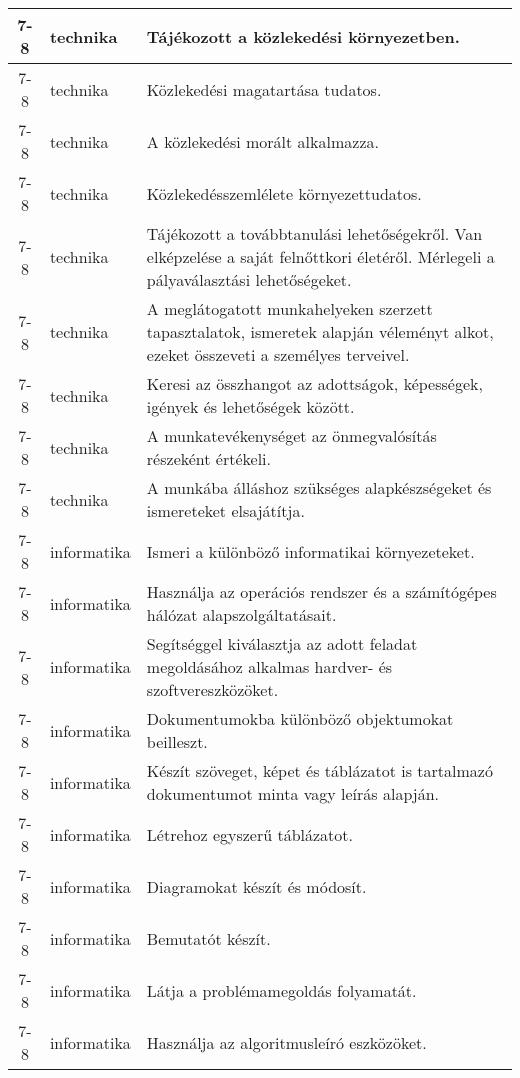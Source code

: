 \begin{small}
\begin{longtable}{c | p{2cm} |  p{11cm} }
              7-8 & technika & Tájékozott a közlekedési környezetben. \\ \hline
              7-8 & technika & Közlekedési magatartása tudatos. \\ \hline
              7-8 & technika & A közlekedési morált alkalmazza. \\ \hline
              7-8 & technika & Közlekedésszemlélete környezettudatos. \\ \hline
              7-8 & technika & Tájékozott a továbbtanulási lehetőségekről. Van elképzelése a saját felnőttkori életéről. Mérlegeli a pályaválasztási lehetőségeket. \\ \hline
              7-8 & technika & A meglátogatott munkahelyeken szerzett tapasztalatok, ismeretek alapján véleményt alkot, ezeket összeveti a személyes terveivel. \\ \hline
              7-8 & technika & Keresi az összhangot az adottságok, képességek, igények és lehetőségek között. \\ \hline
              7-8 & technika & A munkatevékenységet az önmegvalósítás részeként értékeli. \\ \hline
              7-8 & technika & A munkába álláshoz szükséges alapkészségeket és ismereteket elsajátítja. \\ \hline
              7-8 & informatika & Ismeri a különböző informatikai környezeteket. \\ \hline
              7-8 & informatika & Használja az operációs rendszer és a számítógépes hálózat alapszolgáltatásait. \\ \hline
              7-8 & informatika & Segítséggel kiválasztja az adott feladat megoldásához alkalmas hardver- és szoftvereszközöket. \\ \hline
              7-8 & informatika & Dokumentumokba különböző objektumokat beilleszt. \\ \hline
              7-8 & informatika & Készít szöveget, képet és táblázatot is tartalmazó dokumentumot minta vagy leírás alapján. \\ \hline
              7-8 & informatika & Létrehoz egyszerű táblázatot. \\ \hline
              7-8 & informatika & Diagramokat készít és módosít. \\ \hline
              7-8 & informatika & Bemutatót készít. \\ \hline
              7-8 & informatika & Látja a problémamegoldás folyamatát. \\ \hline
              7-8 & informatika & Használja az algoritmusleíró eszközöket. \\ \hline

\end{longtable}
\end{small}
